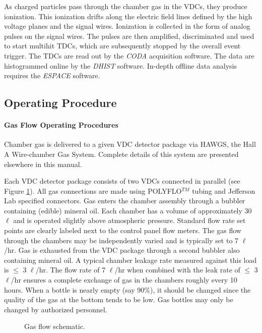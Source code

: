 \documentclass[12pt]{article}
\begin{document}
As charged particles pass through the chamber gas in the VDCs, they
produce ionization.  This ionization drifts along the electric field
lines defined by the high voltage planes and the signal wires.  
Ionization is collected in the form of analog pulses on the signal
wires.  The pulses are then amplified, discriminated and used to
start multihit TDCs, which are subsequently stopped by the overall
event trigger.  The TDCs are read out by the {\it CODA} acquisition
software.  The data are histogrammed online by the {\it DHIST}
software.  In-depth offline data analysis requires the {\it ESPACE}
software.

\subsection{Operating Procedure}
\paragraph {Gas Flow Operating Procedures}

Chamber gas is delivered to a given VDC detector package via HAWGS,
the Hall A Wire-chamber Gas System.  Complete details of this system
are presented elsewhere in this manual.

Each VDC detector package consists of two VDCs connected in parallel
(see Figure \ref{gasflow}).  All gas connections are made using
POLYFLO$^{TM}$ tubing and Jefferson Lab specified connectors.  Gas enters the
chamber assembly through a bubbler containing (edible) mineral oil.
Each chamber has a volume of approximately 30 $\ell$ and is operated
slightly above atmospheric pressure.  Standard flow rate set points
are clearly labeled next to the control panel flow meters.  The gas
flow through the chambers may be independently varied and is typically
set to 7 $\ell$/hr.  Gas is exhausted from the VDC package through a
second bubbler also containing mineral oil.  A typical chamber leakage
rate measured against this load is $\le$ 3 $\ell$/hr.  The flow rate of
7 $\ell$/hr when combined with the leak rate of $\le$ 3 $\ell$/hr
ensures a complete exchange of gas in the chambers roughly every
10 hours.
When a
bottle is nearly empty (say 90\%), it should be changed since the
quality of the gas at the bottom tends to be low.  Gas bottles may
only be changed by authorized personnel.

\begin{figure}[H]
\setlength{\epsfxsize}{1.00\textwidth}
\setlength{\epsfysize}{0.825\textwidth}
\leavevmode
{}
\caption{Gas flow schematic.}
\label{gasflow}
\end{figure}
\end{document}
